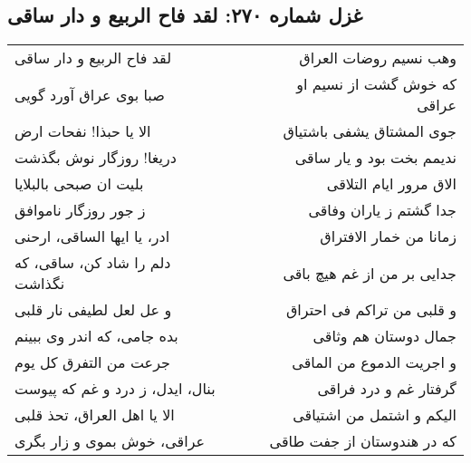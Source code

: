 \begin{center}
\section*{غزل شماره ۲۷۰: لقد فاح الربیع و دار ساقی}
\label{sec:270}
\begin{longtable}{l p{0.5cm} r}
لقد فاح الربیع و دار ساقی
&&
وهب نسیم روضات العراق
\\
صبا بوی عراق آورد گویی
&&
که خوش گشت از نسیم او عراقی
\\
الا یا حبذا! نفحات ارض
&&
جوی المشتاق یشفی باشتیاق
\\
دریغا! روزگار نوش بگذشت
&&
ندیمم بخت بود و یار ساقی
\\
بلیت ان صبحی بالبلایا
&&
الاق مرور ایام التلاقی
\\
ز جور روزگار ناموافق
&&
جدا گشتم ز یاران وفاقی
\\
ادر، یا ایها الساقی، ارحنی
&&
زمانا من خمار الافتراق
\\
دلم را شاد کن، ساقی، که نگذاشت
&&
جدایی بر من از غم هیچ باقی
\\
و عل لعل لطیفی نار قلبی
&&
و قلبی من تراکم فی احتراق
\\
بده جامی، که اندر وی ببینم
&&
جمال دوستان هم وثاقی
\\
جرعت من التفرق کل یوم
&&
و اجریت الدموع من الماقی
\\
بنال، ایدل، ز درد و غم که پیوست
&&
گرفتار غم و درد فراقی
\\
الا یا اهل العراق، تحذ قلبی
&&
الیکم و اشتمل من اشتیاقی
\\
عراقی، خوش بموی و زار بگری
&&
که در هندوستان از جفت طاقی
\\
\end{longtable}
\end{center}
